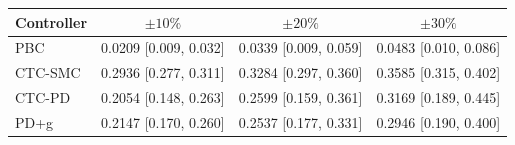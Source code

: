 \begin{tabular}{lccc}
\toprule
Controller & $\pm 10\%$ & $\pm 20\%$ & $\pm 30\%$ \\
\midrule
PBC     & 0.0209 [0.009, 0.032] & 0.0339 [0.009, 0.059] & 0.0483 [0.010, 0.086] \\
CTC-SMC & 0.2936 [0.277, 0.311] & 0.3284 [0.297, 0.360] & 0.3585 [0.315, 0.402] \\
CTC-PD  & 0.2054 [0.148, 0.263] & 0.2599 [0.159, 0.361] & 0.3169 [0.189, 0.445] \\
PD+g    & 0.2147 [0.170, 0.260] & 0.2537 [0.177, 0.331] & 0.2946 [0.190, 0.400] \\
\bottomrule
\end{tabular}
